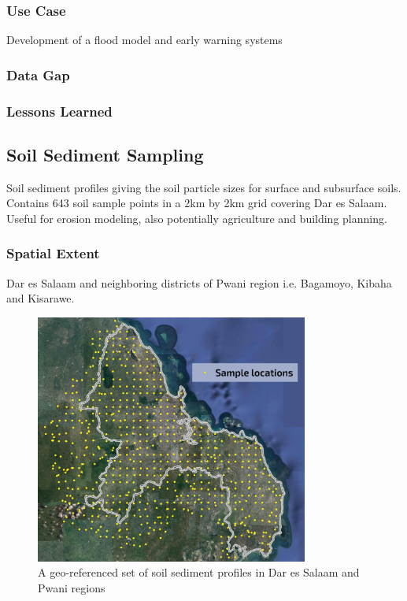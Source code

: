 \documentclass[a4paper,12pt,twoside]{article}
\begin{document}
\subsubsection{Use Case}
Development of a flood model and early warning systems

\subsubsection{Data Gap}

\subsubsection{Lessons Learned}

\newpage
\subsection{Soil Sediment Sampling}

Soil sediment profiles giving the soil particle sizes for surface and subsurface soils. Contains 643 soil sample points in a 2km by 2km grid covering Dar es Salaam.
Useful for erosion modeling, also potentially agriculture and building planning. 

\subsubsection{Spatial Extent}
Dar es Salaam and neighboring districts of Pwani region i.e. Bagamoyo, Kibaha and Kisarawe.

\begin{figure}[h]
  \color{RHgreen}\caption{A geo-referenced set of soil sediment profiles in Dar es Salaam and Pwani regions}
  \centering
  \includegraphics[width=0.8\textwidth]{images/soil_sample_locations.jpg}
\end{figure}
\end{document}
